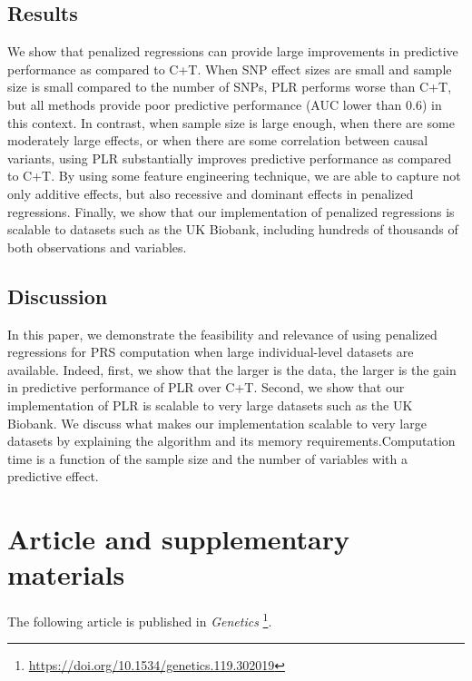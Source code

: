\subsection{Results}

We show that penalized regressions can provide large improvements in predictive performance as compared to C+T. When SNP effect sizes are small and sample size is small compared to the number of SNPs, PLR performs worse than C+T, but all methods provide poor predictive performance (AUC lower than 0.6) in this context.
In contrast, when sample size is large enough, when there are some moderately large effects, or when there are some correlation between causal variants, using PLR substantially improves predictive performance as compared to C+T.
By using some feature engineering technique, we are able to capture not only additive effects, but also recessive and dominant effects in penalized regressions.
Finally, we show that our implementation of penalized regressions is scalable to datasets such as the UK Biobank, including hundreds of thousands of both observations and variables.

\subsection{Discussion}

In this paper, we demonstrate the feasibility and relevance of using penalized regressions for PRS computation when large individual-level datasets are available. Indeed, first, we show that the larger is the data, the larger is the gain in predictive performance of PLR over C+T. Second, we show that our implementation of PLR is scalable to very large datasets such as the UK Biobank.
We discuss what makes our implementation scalable to very large datasets by explaining the algorithm and its memory requirements.Computation time is a function of the sample size and the number of variables with a predictive effect.




\section{Article and supplementary materials}

The following article is published in \textit{Genetics}	\footnote{\url{https://doi.org/10.1534/genetics.119.302019}}.



